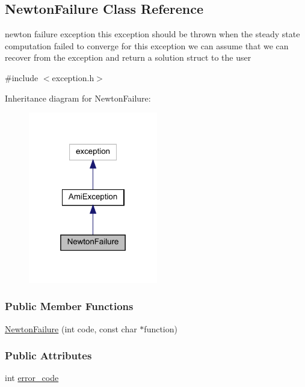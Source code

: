 \hypertarget{classamici_1_1_newton_failure}{}\subsection{Newton\+Failure Class Reference}
\label{classamici_1_1_newton_failure}


newton failure exception this exception should be thrown when the steady state computation failed to converge for this exception we can assume that we can recover from the exception and return a solution struct to the user  




{\ttfamily \#include $<$exception.\+h$>$}



Inheritance diagram for Newton\+Failure\+:
\nopagebreak
\begin{figure}[H]
\begin{center}
\leavevmode
\includegraphics[width=160pt]{classamici_1_1_newton_failure__inherit__graph}
\end{center}
\end{figure}
\subsubsection*{Public Member Functions}
\begin{DoxyCompactItemize}
\item 
\mbox{\hyperlink{classamici_1_1_newton_failure_abb7a5bc514c646f2411344f71c2f7e6f}{Newton\+Failure}} (int code, const char $\ast$function)
\end{DoxyCompactItemize}
\subsubsection*{Public Attributes}
\begin{DoxyCompactItemize}
\item 
int \mbox{\hyperlink{classamici_1_1_newton_failure_a7d16b1c68c87cec009d972e79abfba78}{error\+\_\+code}}
\end{DoxyCompactItemize}



